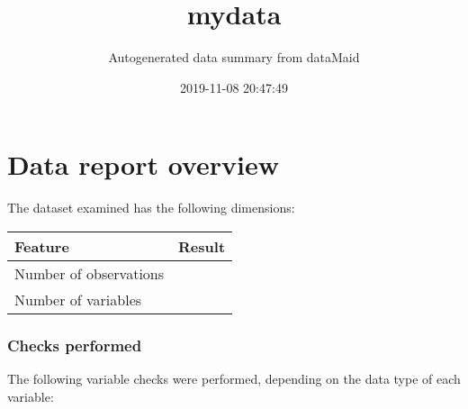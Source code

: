 \documentclass[]{report}
\title{mydata}
\subtitle{Autogenerated data summary from dataMaid}
\author{}
\date{2019-11-08 20:47:49}
\begin{document}
\maketitle

\hypertarget{data-report-overview}{%
\chapter{Data report overview}\label{data-report-overview}}

The dataset examined has the following dimensions:

\begin{longtable}[]{@{}lr@{}}
\toprule
\begin{minipage}[b]{0.33\columnwidth}\raggedright
Feature\strut
\end{minipage} & \begin{minipage}[b]{0.12\columnwidth}\raggedleft
Result\strut
\end{minipage}\tabularnewline
\midrule
\endhead
\begin{minipage}[t]{0.33\columnwidth}\raggedright
Number of observations\strut
\end{minipage} & \begin{minipage}[t]{0.12\columnwidth}\raggedleft
250\strut
\end{minipage}\tabularnewline
\begin{minipage}[t]{0.33\columnwidth}\raggedright
Number of variables\strut
\end{minipage} & \begin{minipage}[t]{0.12\columnwidth}\raggedleft
20\strut
\end{minipage}\tabularnewline
\bottomrule
\end{longtable}

\hypertarget{checks-performed}{%
\subsection{Checks performed}\label{checks-performed}}

The following variable checks were performed, depending on the data type
of each variable:
\end{document}
